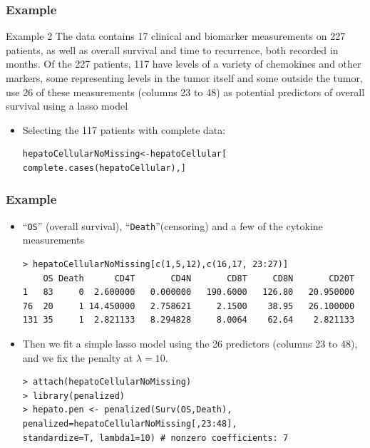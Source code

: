 \documentclass{beamer}
\begin{document}
\pagebreak
\begin{frame}[fragile]
\frametitle{Example}
\begin{problock}{Example 2}
The data contains 17 clinical and biomarker measurements on 227 patients, as well as overall survival and time to recurrence, both recorded in months. Of the 227 patients, 117 have levels of a variety of chemokines and other markers, some representing levels in the tumor itself and some outside the tumor, use 26 of these measurements (columns 23 to 48) as potential predictors of overall survival using a lasso model
\end{problock}
\begin{itemize}
\item Selecting the 117 patients with complete data:
\begin{Verbatim}
hepatoCellularNoMissing<-hepatoCellular[
complete.cases(hepatoCellular),]
\end{Verbatim}
\end{itemize}
\end{frame}

\pagebreak
\begin{frame}[fragile]
\frametitle{Example}
\begin{itemize}
\item ``\texttt{OS}'' (overall survival), ``\texttt{Death}''(censoring) and a few of the cytokine measurements
\begin{Verbatim}
> hepatoCellularNoMissing[c(1,5,12),c(16,17, 23:27)]
    OS Death      CD4T       CD4N       CD8T     CD8N       CD20T
1   83     0  2.600000   0.000000   190.6000   126.80   20.950000 
76  20     1 14.450000   2.758621     2.1500    38.95   26.100000
131 35     1  2.821133   8.294828     8.0064    62.64    2.821133
\end{Verbatim}
\item Then we fit a simple lasso model using the 26 predictors (columns 23 to 48), and we fix the penalty at $\lambda = 10$.
\begin{Verbatim}
> attach(hepatoCellularNoMissing)
> library(penalized)
> hepato.pen <- penalized(Surv(OS,Death),
penalized=hepatoCellularNoMissing[,23:48],
standardize=T, lambda1=10) # nonzero coefficients: 7
\end{Verbatim}
\end{itemize}
\end{frame}
\end{document}
